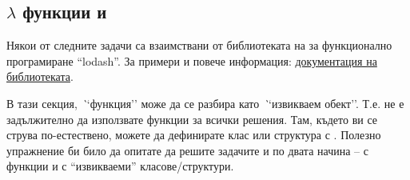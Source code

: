 \subsection{$\lambda$ функции и }

\begin{mdframed}[hidealllines=true,backgroundcolor=gray!20]
  Някои от следните задачи са взаимствани от библиотеката на  за функционално програмиране ``lodash''. За примери и повече информация: \href{https://lodash.com/docs/4.17.15#after}{документация на библиотеката}.
\end{mdframed}

\begin{mdframed}[hidealllines=true,backgroundcolor=gray!20]
  В тази секция, \emph``функция'' може да се разбира като \emph``извикваем обект''. Т.е. не е задължително да използвате  функции за всички решения. Там, където ви се струва по-естествено, можете да дефинирате клас или структура с . Полезно упражнение би било да опитате да решите задачите и по двата начина --  с  функции и с ``извикваеми'' класове/структури.
\end{mdframed}



